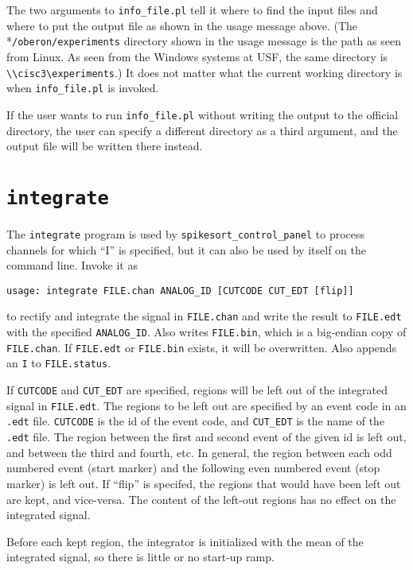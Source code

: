 \documentclass{article}
\begin{document}
The two arguments to {\tt info\_file.pl} tell it where to find the
input files and where to put the output file as shown in the usage
message above.  (The \\*{\tt /oberon/experiments} directory shown in
the usage message is the path as seen from Linux.  As seen
from the Windows systems at USF, the same directory is 
\verb# \\cisc3\experiments#.)  It does not matter what the current
working directory is when {\tt info\_file.pl} is invoked.

If the user wants to run {\tt info\_file.pl} without
writing the output to the official directory, the user can specify a
different directory as a third argument, and the output file will be
written there instead.

\section{\tt integrate}
The {\tt integrate} program is used by {\tt spikesort\_control\_panel}
to process channels for which ``I'' is specified, but it can also be
used by itself on the command line.  Invoke it as
\begin{verbatim}
usage: integrate FILE.chan ANALOG_ID [CUTCODE CUT_EDT [flip]]
\end{verbatim}
to rectify and integrate the signal in {\tt FILE.chan} and write the
result to {\tt FILE.edt} with the specified {\tt ANALOG\_ID}.  Also
writes {\tt FILE.bin}, which is a big-endian copy of {\tt FILE.chan}.
If {\tt FILE.edt} or {\tt FILE.bin} exists, it will be overwritten.
Also appends an {\tt I} to {\tt FILE.status}.

If {\tt CUTCODE} and {\tt CUT\_EDT} are specified, regions will be
left out of the integrated signal in {\tt FILE.edt}.  The regions to
be left out are specified by an event code in an {\tt .edt} file.
{\tt CUTCODE} is the id of the event code, and {\tt CUT\_EDT} is the
name of the {\tt .edt} file.  The region between the first and second
event of the given id is left out, and between the third and fourth,
etc.  In general, the region between each odd numbered event (start
marker) and the following even numbered event (stop marker) is left
out.  If ``flip'' is specifed, the regions that would have been left
out are kept, and vice-versa. The content of the left-out regions has
no effect on the integrated signal.

Before each kept region, the integrator is initialized with the mean
of the integrated signal, so there is little or no start-up ramp.
\end{document}
